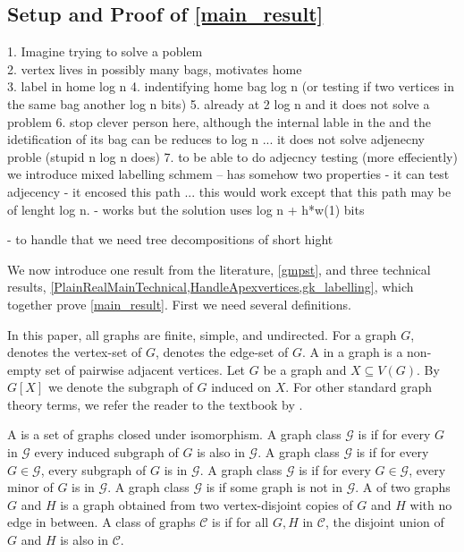 

\subsection{Setup and Proof of \cref{main_result}}
\label{KeyTools}

1. Imagine trying to solve a poblem\\
2. vertex lives in possibly many bags, motivates home\\
3. label in home log n
4. indentifying home bag log n (or testing if two vertices in the same bag another log n bits)
5. already at 2 log n and it does not solve a problem 
6. stop clever person here, although the internal lable in the and the idetification of its bag can be reduces to log n ... it does not solve adjenecny proble (stupid n log n does)
7. to be able to do adjecncy testing (more effeciently) we introduce mixed labelling schmem -- has somehow two properties
- it can test adjecency
- it encosed this path ... this would work except that this path may be of lenght log n. 
- works but the solution uses log n + h*w(1) bits

- to handle that we need tree decompositions of short hight


We now introduce one result from the literature, \cref{gmpst}, and three technical results, \cref{PlainRealMainTechnical,HandleApexvertices,gk_labelling}, which together prove \cref{main_result}. First we need several definitions.

In this paper, all graphs are finite, simple, and undirected.  For a graph $G$,  denotes the vertex-set of $G$,  denotes the edge-set of $G$.  A  in a graph is a non-empty set of pairwise adjacent vertices.   Let $G$ be a graph and $X\subseteq V(G)$. By $G[X]$ we denote the subgraph of $G$ induced on $X$. For other standard graph theory terms, we refer the reader to the textbook by \citet{diestel:graph}.

A  is a set of graphs closed under isomorphism. A graph class  $\mathcal{G}$ is  if for every $G$ in $\mathcal{G}$ every induced subgraph of $G$ is also in $\mathcal{G}$. A  graph class $\mathcal{G}$ is  if for every $G\in\mathcal{G}$, every subgraph of $G$ is in $\mathcal{G}$.
A  graph class $\mathcal{G}$ is  if for every $G\in\mathcal{G}$, every minor of $G$ is in $\mathcal{G}$. A graph class $\mathcal{G}$ is  if some graph is not in $\mathcal{G}$.  A  of two graphs $G$ and $H$ is a graph obtained from two vertex-disjoint copies of $G$ and $H$ with no edge in between. A class of graphs $\mathcal{C}$ is  if for all $G,H$ in $\mathcal{C}$, the disjoint union of $G$ and $H$ is also in $\mathcal{C}$.

